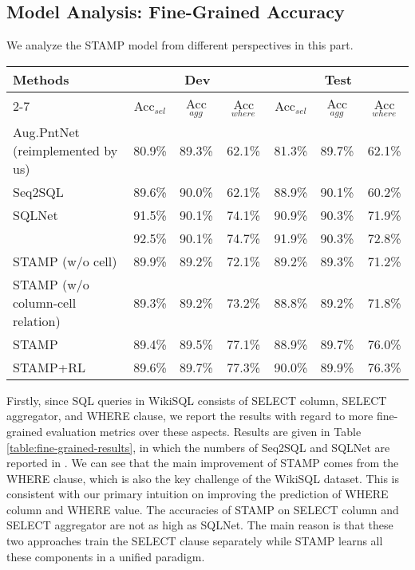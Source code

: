 \documentclass[11pt,a4paper]{article}
\begin{document}
\subsection{Model Analysis: Fine-Grained Accuracy}
We analyze the STAMP model from different perspectives in this part.

\begin{table*}[t]
\centering
	\begin{tabular}{l|ccc|ccc}
		\hline
		\multirow{2}{*}{Methods} & \multicolumn{3}{c|}{Dev} & \multicolumn{3}{c}{Test} \\
		\cline{2-7}
		& {Acc$_{sel}$} & {Acc$_{agg}$} & Acc$_{where}$ & {Acc$_{sel}$} & {Acc$_{agg}$}& Acc$_{where}$\\
		\hline
		Aug.PntNet (reimplemented by us) & 80.9\%& 89.3\%& 62.1\%& 81.3\%& 89.7\%& 62.1\%\\
		Seq2SQL~\cite{zhong2017seq2sql} & 89.6\%& 90.0\%& 62.1\%& 88.9\%& 90.1\%& 60.2\%\\
		SQLNet~\cite{xu2017sqlnet} & 91.5\% & 90.1\%& 74.1\%& 90.9\% & 90.3\%& 71.9\%\\
 		\newcite{DBLP:journals/corr/abs-1801-00076} & 92.5\% & 90.1\% & 74.7\%& 91.9\%& 90.3\%& 72.8\% \\
		
\hline


		STAMP  (w/o cell)& 89.9\%& 89.2\%& 72.1\%& 89.2\%& 89.3\%& 71.2\%\\
STAMP  (w/o column-cell relation) & 89.3\%& 89.2\%& 73.2\%& 88.8\%& 89.2\%& 71.8\%\\
		STAMP  & 89.4\%& 89.5\%& 77.1\%& 88.9\%& 89.7\%& 76.0\%\\
		STAMP+RL& 89.6\%&  89.7\%& 77.3\%&  90.0\%&  89.9\%& 76.3\%\\
		\hline
	\end{tabular}
	\caption{Fine-grained accuracies on the WikiSQL dev and test sets. Accuracy (Acc$_{lf}$) is evaluated on SELECT column (Acc$_{sel}$) , SELECT aggregator (Acc$_{agg}$), and WHERE clause (Acc$_{where}$), respectively. }
	\label{table:fine-grained-results}
\end{table*}

{Firstly}, since SQL queries in WikiSQL \mbox{consists} of SELECT column, SELECT aggregator, and WHERE clause, we report the results with regard to more fine-grained evaluation metrics over these aspects.
Results are given in Table \ref{table:fine-grained-results}, in which the numbers of Seq2SQL and SQLNet are reported in \cite{xu2017sqlnet}.
We can see that the main improvement of STAMP comes from the WHERE clause, which is also the key challenge of the WikiSQL dataset.
This is consistent with our primary intuition on improving the prediction of WHERE column and WHERE value.
The accuracies of \mbox{STAMP} on SELECT column and SELECT aggregator are not as high as SQLNet.
The main reason is that these two approaches train the \mbox{SELECT} clause separately while STAMP learns all these components in a unified paradigm.
\end{document}
